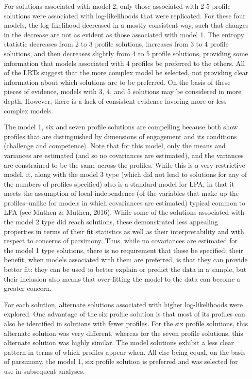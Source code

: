 \documentclass[]{msu-thesis}
\theoremstyle{definition}
\theoremstyle{definition}
\theoremstyle{definition}
\theoremstyle{remark}
\begin{document}
For solutions associated with model 2, only those associated with 2-5
profile solutions were associated with log-likelihoods that were
replicated. For these four models, the log-likelihood decreased in a
mostly consistent way, such that changes in the decrease are not as
evident as those associated with model 1. The entropy statistic
decreases from 2 to 3 profile solutions, increases from 3 to 4 profile
solutions, and then decreases slightly from 4 to 5 profile solutions,
providing some information that models associated with 4 profiles be
preferred to the others. All of the LRTs suggest that the more complex
model be selected, not providing clear information about which solutions
are to be preferred. On the basis of these pieces of evidence, models
with 3, 4, and 5 solutions may be considered in more depth. However,
there is a lack of consistent evidence favoring more or less complex
models.

The model 1, six and seven profile solutions are compelling because both
show profiles that are distinguished by dimensions of engagement and its
conditions (challenge and competence). Note that for this model, only
the means and variances are estimated (and so no covariances are
estimated), and the variances are constrained to be the same across the
profiles. While this is a very restrictive model, it, along with the
model 3 type (which did not lead to solutions for any of the numbers of
profiles specified) also is a standard model for LPA, in that it meets
the assumption of local independence (of the variables that make up the
profiles--unlike for models in which covariances are estimated) typical
common to LPA (see Muthen \& Muthen, 2016). While some of the solutions
associated with the model 2 type did reach solutions, these demonstrated
less appealing properties in terms of their fit statistics as well as
their interpretability and with respect to concerns of parsimony. Thus,
while no covariances are estimated for the model 1 type solutions, there
is no requirement that these be specified; their benefit, when models
associated with them are preferred, is that they can provide better fit:
they can be used to better explain or predict the data in a sample, but
their inclusion also means that over-fitting the model to the data can
become a greater concern.

For each solution, alternate solutions associated with higher
log-likelihoods were explored. One advantage of the six profile solution
is that most of its profiles can also be identified in solutions with
fewer profiles. For the six profile solutions, this alternate solution
was very different, whereas for the seven profile solutions, this
alternate solution was highly similar. The model solutions exhibit a
less clear pattern in terms of which profiles appear when. All else
being equal, on the basis of parsimony, the model 1, six profile
solution is preferred and was selected for use in subsequent analyses.
\end{document}
